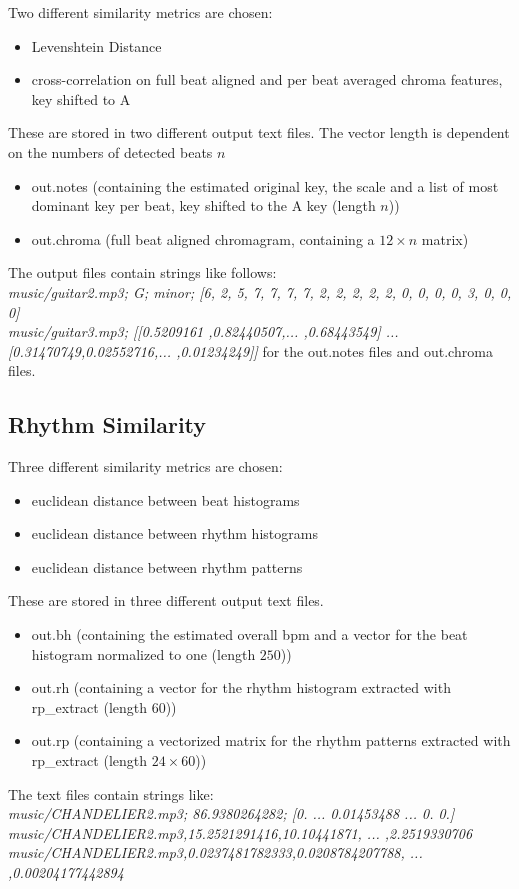 Two different similarity metrics are chosen: 
\begin{itemize}
	\item Levenshtein Distance
	\item cross-correlation on full beat aligned and per beat averaged chroma features, key shifted to A
\end{itemize}
These are stored in two different output text files. The vector length is dependent on the numbers of detected beats $n$
\begin{itemize}
	\item out.notes (containing the estimated original key, the scale and a list of most dominant key per beat, key shifted to the A key (length $n$))
	\item out.chroma (full beat aligned chromagram, containing a $12 \times n$ matrix)
\end{itemize}
The output files contain strings like follows:\\
\textit{music/guitar2.mp3; G; minor; [6, 2, 5, 7, 7, 7, 7, 2, 2, 2, 2, 2, 0, 0, 0, 0, 3, 0, 0, 0]}\\
\textit{music/guitar3.mp3; [[0.5209161 ,0.82440507,... ,0.68443549] ... [0.31470749,0.02552716,... ,0.01234249]]}
for the out.notes files and out.chroma files. 

\subsection{Rhythm Similarity}

Three different similarity metrics are chosen: 
\begin{itemize}
	\item euclidean distance between beat histograms
	\item euclidean distance between rhythm histograms
	\item euclidean distance between rhythm patterns
\end{itemize}
These are stored in three different output text files.
\begin{itemize}
	\item out.bh (containing the estimated overall bpm and a vector for the beat histogram normalized to one (length $250$))
	\item out.rh (containing a vector for the rhythm histogram extracted with rp\_extract (length $60$))
	\item out.rp (containing a vectorized matrix for the rhythm patterns extracted with rp\_extract (length $24 \times 60$))
\end{itemize}
The text files contain strings like:\\
\textit{music/CHANDELIER2.mp3; 86.9380264282; [0. ... 0.01453488 ...  0.  0.]}\\
\textit{music/CHANDELIER2.mp3,15.2521291416,10.10441871, ... ,2.2519330706}\\
\textit{music/CHANDELIER2.mp3,0.0237481782333,0.0208784207788, ... ,0.00204177442894}\\